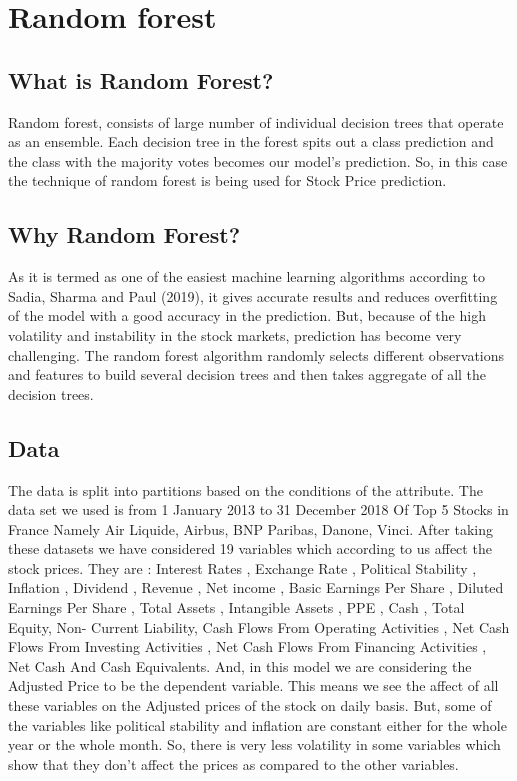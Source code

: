 \documentclass[
  11pt,
]{article}
\begin{document}
\newpage

\hypertarget{random-forest}{%
\section{Random forest}\label{random-forest}}

\hypertarget{what-is-random-forest}{%
\subsection{What is Random Forest?}\label{what-is-random-forest}}

Random forest, consists of large number of individual decision trees
that operate as an ensemble. Each decision tree in the forest spits out
a class prediction and the class with the majority votes becomes our
model's prediction. So, in this case the technique of random forest is
being used for Stock Price prediction.

\hypertarget{why-random-forest}{%
\subsection{Why Random Forest?}\label{why-random-forest}}

As it is termed as one of the easiest machine learning algorithms
according to Sadia, Sharma and Paul (2019), it gives accurate results
and reduces overfitting of the model with a good accuracy in the
prediction. But, because of the high volatility and instability in the
stock markets, prediction has become very challenging. The random forest
algorithm randomly selects different observations and features to build
several decision trees and then takes aggregate of all the decision
trees.

\hypertarget{data-1}{%
\subsection{Data}\label{data-1}}

The data is split into partitions based on the conditions of the
attribute. The data set we used is from 1 January 2013 to 31 December
2018 Of Top 5 Stocks in France Namely Air Liquide, Airbus, BNP Paribas,
Danone, Vinci. After taking these datasets we have considered 19
variables which according to us affect the stock prices. They are :
Interest Rates , Exchange Rate , Political Stability , Inflation ,
Dividend , Revenue , Net income , Basic Earnings Per Share , Diluted
Earnings Per Share , Total Assets , Intangible Assets , PPE , Cash ,
Total Equity, Non- Current Liability, Cash Flows From Operating
Activities , Net Cash Flows From Investing Activities , Net Cash Flows
From Financing Activities , Net Cash And Cash Equivalents. And, in this
model we are considering the Adjusted Price to be the dependent
variable. This means we see the affect of all these variables on the
Adjusted prices of the stock on daily basis. But, some of the variables
like political stability and inflation are constant either for the whole
year or the whole month. So, there is very less volatility in some
variables which show that they don't affect the prices as compared to
the other variables.
\end{document}
